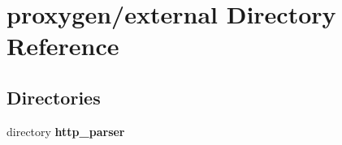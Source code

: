 \section{proxygen/external Directory Reference}
\label{dir_9ebccea22de75eb5c2ba14f793858994}
\subsection*{Directories}
\begin{DoxyCompactItemize}
\item 
directory {\bf http\+\_\+parser}
\end{DoxyCompactItemize}
